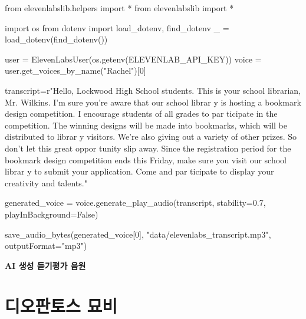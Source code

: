 \documentclass[
  letterpaper,
]{book}
\newenvironment{Shaded}{\begin{snugshade}}{\end{snugshade}}
\newcommand{\DecValTok}[1]{\textcolor[rgb]{0.68,0.00,0.00}{#1}}
\newcommand{\FloatTok}[1]{\textcolor[rgb]{0.68,0.00,0.00}{#1}}
\newcommand{\ImportTok}[1]{\textcolor[rgb]{0.00,0.46,0.62}{#1}}
\newcommand{\NormalTok}[1]{\textcolor[rgb]{0.00,0.23,0.31}{#1}}
\newcommand{\OperatorTok}[1]{\textcolor[rgb]{0.37,0.37,0.37}{#1}}
\newcommand{\StringTok}[1]{\textcolor[rgb]{0.13,0.47,0.30}{#1}}
\newcommand{\VariableTok}[1]{\textcolor[rgb]{0.07,0.07,0.07}{#1}}
\newcommand{\VerbatimStringTok}[1]{\textcolor[rgb]{0.13,0.47,0.30}{#1}}
\begin{document}
\begin{Shaded}
\begin{Highlighting}[]
\ImportTok{from}\NormalTok{ elevenlabslib.helpers }\ImportTok{import} \OperatorTok{*}
\ImportTok{from}\NormalTok{ elevenlabslib }\ImportTok{import} \OperatorTok{*}

\ImportTok{import}\NormalTok{ os}
\ImportTok{from}\NormalTok{ dotenv }\ImportTok{import}\NormalTok{ load\_dotenv, find\_dotenv}
\NormalTok{\_ }\OperatorTok{=}\NormalTok{ load\_dotenv(find\_dotenv())}

\NormalTok{user }\OperatorTok{=}\NormalTok{ ElevenLabsUser(os.getenv(}\StringTok{\textquotesingle{}ELEVENLAB\_API\_KEY\textquotesingle{}}\NormalTok{))}
\NormalTok{voice }\OperatorTok{=}\NormalTok{ user.get\_voices\_by\_name(}\StringTok{"Rachel"}\NormalTok{)[}\DecValTok{0}\NormalTok{]}

\NormalTok{transcript}\OperatorTok{=}\VerbatimStringTok{r"Hello, Lockwood High School students. This is your school librarian, Mr. Wilkins. I’m sure you’re aware that our school librar y is hosting a bookmark design competition. I encourage students of all grades to par ticipate in the competition. The winning designs will be made into bookmarks, which will be distributed to librar y visitors. We’re also giving out a variety of other prizes. So don’t let this great oppor tunity slip away. Since the registration period for the bookmark design competition ends this Friday, make sure you visit our school librar y to submit your application. Come and par ticipate to display your creativity and talents."}


\NormalTok{generated\_voice }\OperatorTok{=}\NormalTok{ voice.generate\_play\_audio(transcript, stability}\OperatorTok{=}\FloatTok{0.7}\NormalTok{,}
\NormalTok{                                             playInBackground}\OperatorTok{=}\VariableTok{False}\NormalTok{)}

\NormalTok{save\_audio\_bytes(generated\_voice[}\DecValTok{0}\NormalTok{], }\StringTok{"data/elevenlabs\_transcript.mp3"}\NormalTok{, outputFormat}\OperatorTok{=}\StringTok{"mp3"}\NormalTok{)}
\end{Highlighting}
\end{Shaded}

\textbf{AI 생성 듣기평가 음원}

\hypertarget{uxb514uxc624uxd310uxd1a0uxc2a4-uxbb18uxbe44}{%
\section{디오판토스
묘비}\label{uxb514uxc624uxd310uxd1a0uxc2a4-uxbb18uxbe44}}
\end{document}
